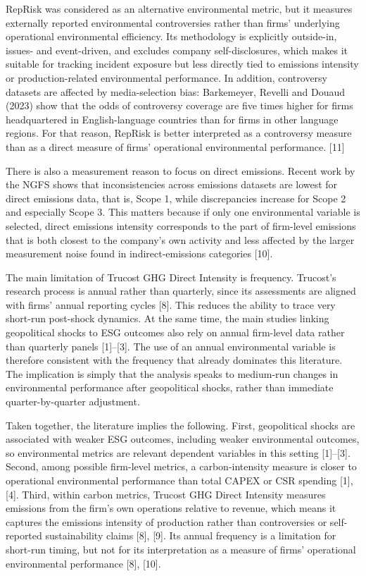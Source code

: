 \documentclass[12pt,a4paper]{article}
\begin{document}
RepRisk was considered as an alternative environmental metric, but it measures externally reported environmental controversies rather than firms’ underlying operational environmental efficiency. Its methodology is explicitly outside-in, issues- and event-driven, and excludes company self-disclosures, which makes it suitable for tracking incident exposure but less directly tied to emissions intensity or production-related environmental performance. In addition, controversy datasets are affected by media-selection bias: Barkemeyer, Revelli and Douaud (2023) show that the odds of controversy coverage are five times higher for firms headquartered in English-language countries than for firms in other language regions. For that reason, RepRisk is better interpreted as a controversy measure than as a direct measure of firms’ operational environmental performance. [11]

There is also a measurement reason to focus on direct emissions. Recent work by the NGFS shows that inconsistencies across emissions datasets are lowest for direct emissions data, that is, Scope 1, while discrepancies increase for Scope 2 and especially Scope 3. This matters because if only one environmental variable is selected, direct emissions intensity corresponds to the part of firm-level emissions that is both closest to the company’s own activity and less affected by the larger measurement noise found in indirect-emissions categories [10].

The main limitation of Trucost GHG Direct Intensity is frequency. Trucost’s research process is annual rather than quarterly, since its assessments are aligned with firms’ annual reporting cycles [8]. This reduces the ability to trace very short-run post-shock dynamics. At the same time, the main studies linking geopolitical shocks to ESG outcomes also rely on annual firm-level data rather than quarterly panels [1]–[3]. The use of an annual environmental variable is therefore consistent with the frequency that already dominates this literature. The implication is simply that the analysis speaks to medium-run changes in environmental performance after geopolitical shocks, rather than immediate quarter-by-quarter adjustment.

Taken together, the literature implies the following. First, geopolitical shocks are associated with weaker ESG outcomes, including weaker environmental outcomes, so environmental metrics are relevant dependent variables in this setting [1]–[3]. Second, among possible firm-level metrics, a carbon-intensity measure is closer to operational environmental performance than total CAPEX or CSR spending [1], [4]. Third, within carbon metrics, Trucost GHG Direct Intensity measures emissions from the firm’s own operations relative to revenue, which means it captures the emissions intensity of production rather than controversies or self-reported sustainability claims [8], [9]. Its annual frequency is a limitation for short-run timing, but not for its interpretation as a measure of firms’ operational environmental performance [8], [10]. 
\end{document}
